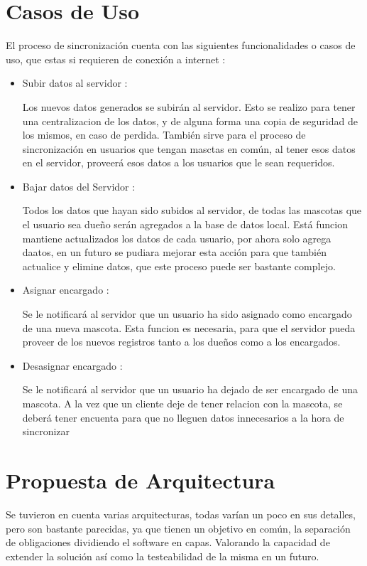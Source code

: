 \section{Casos de Uso}
El proceso de sincronización cuenta con las siguientes funcionalidades o casos de uso, que estas si requieren de conexión a internet :
\begin{itemize}
	\item Subir datos al servidor :
	
	Los nuevos datos generados se subirán al servidor. Esto se realizo para tener una centralizacion de los datos, y de alguna forma una copia de seguridad de los mismos, en caso de perdida. También sirve para el proceso de sincronización en usuarios que tengan masctas en común, al tener esos datos en el servidor, proveerá esos datos a los usuarios que le sean requeridos.
	
	\item Bajar datos del Servidor :
	
	Todos los datos que hayan sido subidos al servidor, de todas las mascotas que el usuario sea dueño serán agregados a la base de datos local. Está funcion mantiene actualizados los datos de cada usuario, por ahora solo agrega daatos, en un futuro se pudiara mejorar esta acción para que también actualice y elimine datos, que este proceso puede ser bastante complejo. 
	
	\item Asignar encargado :
	
	Se le notificará al servidor que un usuario ha sido asignado como encargado de una nueva mascota. Esta funcion es necesaria, para que el servidor pueda proveer de los nuevos registros tanto a los dueños como a los encargados.
	
		\item Desasignar encargado :
	
	Se le notificará al servidor que un usuario ha dejado de ser  encargado de una mascota. A la vez que un cliente deje de tener relacion con la mascota, se deberá tener encuenta para que no lleguen datos innecesarios a la hora de sincronizar   
\end{itemize}

  \section{Propuesta de Arquitectura}
  
  Se tuvieron en cuenta varias arquitecturas, todas varían un poco en sus detalles, pero son bastante parecidas, ya que tienen un objetivo en común, la separación de obligaciones dividiendo el software en capas. Valorando la capacidad de extender la solución así como la testeabilidad de la misma en un futuro.
  
